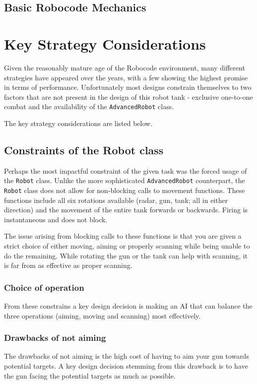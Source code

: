 \documentclass[11pt]{report}
\begin{document}
\section{Basic Robocode Mechanics}

\chapter{Key Strategy Considerations} %

Given the reasonably mature age of the Robocode environment, many different strategies have appeared over the years, with a few showing the highest promise in terms of performance. Unfortunately most designs constrain themselves to two factors that are not present in the design of this robot tank - exclusive one-to-one combat and the availability of the \texttt{AdvancedRobot} class.

The key strategy considerations are listed below.

\section{Constraints of the Robot class}
Perhaps the most impactful constraint of the given task was the forced usage of the \texttt{Robot} class. Unlike the more sophisticated \texttt{AdvancedRobot} counterpart, the \texttt{Robot} class does not allow for non-blocking calls to movement functions. These functions include all six rotations available (radar, gun, tank; all in either direction) and the movement of the entire tank forwards or backwards. Firing is instantaneous and does not block.

The issue arising from blocking calls to these functions is that you are given a strict choice of either moving, aiming or properly scanning while being unable to do the remaining. While rotating the gun or the tank can help with scanning, it is far from as effective as proper scanning.

\subsection{Choice of operation}
From these constrains a key design decision is making an AI that can balance the three operations (aiming, moving and scanning) most effectively.

\subsection{Drawbacks of not aiming}
The drawbacks of not aiming is the high cost of having to aim your gun towards potential targets. A key design decision stemming from this drawback is to have the gun facing the potential targets as much as possible.
\end{document}
